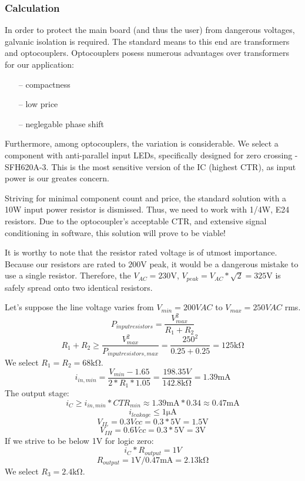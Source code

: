 \subsubsection{Calculation}
In order to protect the main board (and thus the user) from dangerous voltages, galvanic isolation is required.
The standard means to this end are transformers and optocouplers.
Optocouplers posess numerous advantages over transformers for our application:
\begin{itemize}
\item[--]{compactness}
\item[--]{low price}
\item[--]{neglegable phase shift}
\end{itemize}
Furthermore, among optocouplers, the variation is considerable.
We select a component with anti-parallel input LEDs, specifically designed for zero crossing - SFH620A-3.
This is the most sensitive version of the IC (highest CTR), as input power is our greates concern.
\par
Striving for minimal component count and price, the standard solution with a 10W input power resistor is dismissed.
Thus, we need to work with 1/4W, E24 resistors.
Due to the optocoupler's acceptable CTR, and extensive signal conditioning in software, this solution will prove to be viable!
\par
It is worthy to note that the resistor rated voltage is of utmost importance.
Because our resistors are rated to $200\si{\volt}$ peak, it would be a dangerous mistake to use a single resistor.
Therefore, the $V_{AC} = 230\si{\volt}$, $V_{peak} = V_{AC} * \sqrt{2} = 325\si{\volt}$ is safely spread onto two identical resistors.
\par
Let's suppose the line voltage varies from $V_{min} = 200VAC$ to $V_{max} = 250VAC$ rms.
$$ P_{input resistors} = \frac{V_{max}^2}{R_1 + R_2}$$
$$ R_1 + R_2 \geq \frac{V_{max}^2}{P_{input resistors, max}} = \frac{250^2}{0.25+0.25} = 125\si{\kilo\ohm}$$
We select $R_1 = R_2 = 68\si{\kilo\ohm}$.
$$ i_{in, min} = \frac{V_{min} - 1.65}{2 * R_1 *1.05} = \frac{198.35V}{142.8\si{\kilo\ohm}} =  1.39\si{\milli\ampere}$$
The output stage:
$$  i_C \geq i_{in, min} * CTR_{min} \approx 1.39 \si{\milli\ampere} * 0.34 \approx 0.47\si{\milli\ampere} $$
$$ i_{leakage} \leq 1\si{\micro\ampere} $$
$$ V_{IL} = 0.3 Vcc = 0.3 * 5\si{\volt} = 1.5\si{\volt} $$
$$ V_{IH} = 0.6 Vcc = 0.3 * 5\si{\volt} = 3\si{\volt} $$
If we strive to be below 1V for logic zero:
$$ i_C * R_{output} = 1V $$
$$ R_{output} = 1\si{\volt} / 0.47\si{\milli\ampere} = 2.13\si{\kilo\ohm}$$
We select $R_3 = 2.4\si{\kilo\ohm}$.

